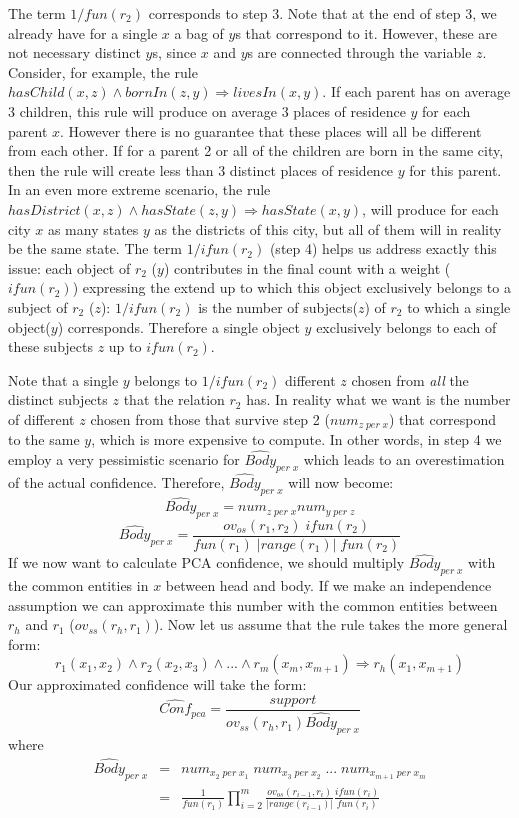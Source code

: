 {The term $1/fun(r_2)$ corresponds to step 3. Note that at the end of step 3, we already have for a single $x$ a bag of $y$s that correspond to it.
However, these are not necessary distinct $y$s, since $x$ and $y$s are connected through the variable $z$.
Consider, for example, the rule $hasChild(x,z) \wedge bornIn(z,y)\Rightarrow livesIn(x,y)$. If each parent has on average 3 children, this rule will produce on average 3 places of residence $y$ for each parent $x$.
However there is no guarantee that these places will all be different from each other.
If for a parent 2 or all of the children are born in the same city, then the rule will create less than 3 distinct places of residence $y$ for this parent.
In an even more extreme scenario,  the rule $hasDistrict(x,z) \wedge hasState(z,y) \Rightarrow hasState(x,y)$,
will produce for each city $x$ as many states $y$ as the districts of this city, but all of them will in reality be the same state.
The term $1/ifun(r_2)$ (step 4) helps us address exactly this issue: each object of $r_2$ ($y$) contributes in the final count with a weight ($ifun(r_2)$) expressing the extend up to which
this object exclusively belongs to a subject of $r_2$ ($z$):
$1/ifun(r_2)$ is the number of subjects($z$) of $r_2$  to which a single object($y$) corresponds. Therefore a single object $y$ exclusively belongs to each of these subjects $z$ up to $ifun(r_2)$.

Note that a single $y$ belongs to $1/ifun(r_2)$ different $z$ chosen from \emph{all} the distinct subjects $z$ that the relation $r_2$ has.
In reality what we want is the number of different $z$ chosen from those that survive step 2 ($num_{z\; per \; x}$) that correspond to the same $y$, which is more expensive to compute.
In other words, in step 4 we employ a very pessimistic scenario for $ \widehat {Body}_{per\; x}$ which leads to an overestimation of the actual confidence.
Therefore, $ \widehat {Body}_{per\; x} $ will now become:
\[
 \widehat {Body}_{per\; x}  =  num_{z \; per \; x}num_{y \; per \; z}
\]
\[
 \widehat {Body}_{per\; x}  =  \frac{ov_{os}(r_1,r_2)\;ifun(r_2)}{fun(r_1)\;|range(r_1)|\;fun(r_2)}
\]
If we now want to calculate PCA confidence, we should multiply $  \widehat {Body}_{per\; x} $ with the common entities in $x$ between head and body.
If we make an independence assumption we can approximate this number with the common entities between $r_h$ and $r_1$ ($ov_{ss}(r_h,r_1)$).
Now let us assume that the rule takes the more general form:
\[
 r_1(x_1,x_2)\wedge r_2(x_2,x_3) \wedge ... \wedge r_m(x_{m},x_{m+1}) \Rightarrow r_h(x_1,x_{m+1})
\]
Our approximated confidence will take the form:
\[
\widehat{Conf}_{pca}=\frac{support}{ov_{ss}(r_h,r_1)  \widehat {Body}_{per\; x} }
\]
 where
\begin{eqnarray*}
 \widehat {Body}_{per\; x}  	&=& num_{x_2\; per \; x_1}\;num_{x_3\; per \; x_2}\;...\;num_{x_{m+1}\; per \; x_{m}} \\
		&=& \frac{1}{fun(r_1)}   \prod_{i=2}^{m}\frac{ov_{os}(r_{i-1},r_i)}{|range(r_{i-1})|}\frac{ifun(r_i)}{fun(r_i)}
\end{eqnarray*}

}
